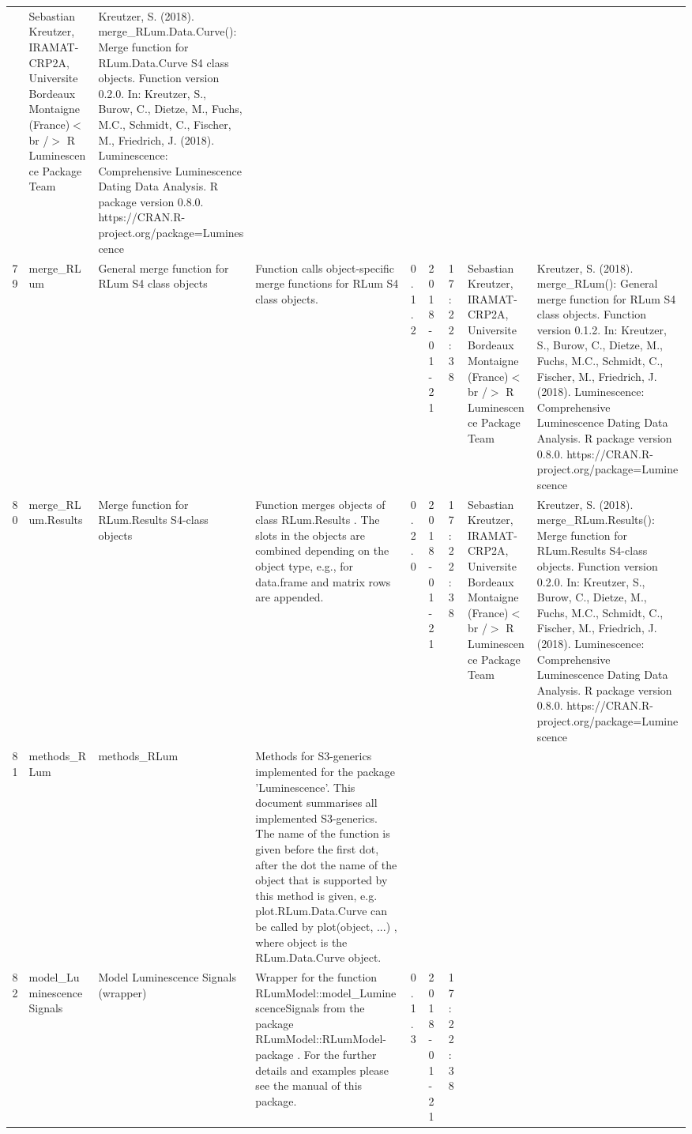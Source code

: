 \begin{table}[ht]
\begin{tabular}{rllllllll}
 & Sebastian Kreutzer, IRAMAT-CRP2A, Universite Bordeaux Montaigne (France)$<$br /$>$  R Luminescence Package Team & Kreutzer, S. (2018). merge\_RLum.Data.Curve(): Merge function for RLum.Data.Curve S4 class objects. Function version 0.2.0. In: Kreutzer, S., Burow, C., Dietze, M., Fuchs, M.C., Schmidt, C., Fischer, M., Friedrich, J. (2018). Luminescence: Comprehensive Luminescence Dating Data Analysis. R package version 0.8.0. https://CRAN.R-project.org/package=Luminescence
 \\ 
  79 & merge\_RLum & General merge function for RLum S4 class objects & Function calls object-specific merge functions for RLum S4 class objects. & 0.1.2 & 2018-01-21 & 17:22:38
 & Sebastian Kreutzer, IRAMAT-CRP2A, Universite Bordeaux Montaigne (France)$<$br /$>$  R Luminescence Package Team & Kreutzer, S. (2018). merge\_RLum(): General merge function for RLum S4 class objects. Function version 0.1.2. In: Kreutzer, S., Burow, C., Dietze, M., Fuchs, M.C., Schmidt, C., Fischer, M., Friedrich, J. (2018). Luminescence: Comprehensive Luminescence Dating Data Analysis. R package version 0.8.0. https://CRAN.R-project.org/package=Luminescence
 \\ 
  80 & merge\_RLum.Results & Merge function for RLum.Results S4-class objects & Function merges objects of class  RLum.Results . The slots in the objects are combined depending on the object type, e.g., for  data.frame  and  matrix  rows are appended. & 0.2.0 & 2018-01-21 & 17:22:38
 & Sebastian Kreutzer, IRAMAT-CRP2A, Universite Bordeaux Montaigne (France)$<$br /$>$  R Luminescence Package Team & Kreutzer, S. (2018). merge\_RLum.Results(): Merge function for RLum.Results S4-class objects. Function version 0.2.0. In: Kreutzer, S., Burow, C., Dietze, M., Fuchs, M.C., Schmidt, C., Fischer, M., Friedrich, J. (2018). Luminescence: Comprehensive Luminescence Dating Data Analysis. R package version 0.8.0. https://CRAN.R-project.org/package=Luminescence
 \\ 
  81 & methods\_RLum & methods\_RLum & Methods for S3-generics implemented for the package 'Luminescence'. This document summarises all implemented S3-generics. The name of the function is given before the first dot, after the dot the name of the object that is supported by this method is given, e.g.  plot.RLum.Data.Curve  can be called by  plot(object, ...) , where  object  is the  RLum.Data.Curve  object. &  &  &  &  &  \\ 
  82 & model\_LuminescenceSignals & Model Luminescence Signals (wrapper) & Wrapper for the function  RLumModel::model\_LuminescenceSignals  from the package RLumModel::RLumModel-package . For the further details and examples please see the manual of this package. & 0.1.3 & 2018-01-21 & 17:22:38

\end{tabular}
\end{table}
